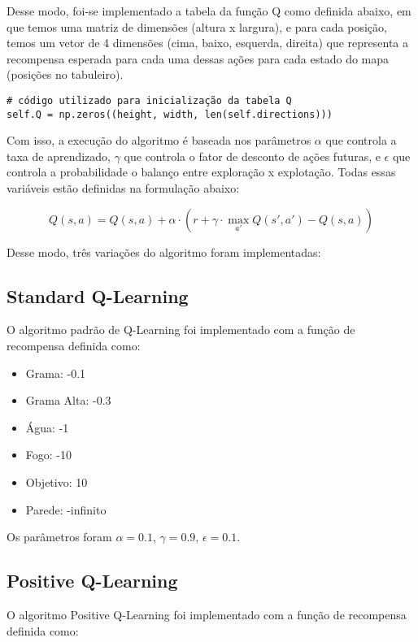 \documentclass[10pt]{extarticle} %
\begin{document}
Desse modo, foi-se implementado a tabela da função Q como definida abaixo, em que temos uma matriz de dimensões (altura x largura), e para cada posição, temos um vetor de 4 dimensões (cima, baixo, esquerda, direita) que representa a recompensa esperada para cada uma dessas ações para cada estado do mapa (posições no tabuleiro).

\begin{verbatim}
# código utilizado para inicialização da tabela Q
self.Q = np.zeros((height, width, len(self.directions)))
\end{verbatim}

Com isso, a execução do algoritmo é baseada nos parâmetros \(\alpha\) que controla a taxa de aprendizado, \(\gamma\) que controla o fator de desconto de ações futuras, e \(\epsilon\) que controla a probabilidade o balanço entre exploração x explotação. Todas essas variáveis estão definidas na formulação abaixo:

\begin{equation}
    Q(s, a) = Q(s, a) + \alpha \cdot (r + \gamma \cdot \max_{a'} Q(s', a') - Q(s, a))
\end{equation}

Desse modo, três variações do algoritmo foram implementadas:

\subsection{Standard Q-Learning}

O algoritmo padrão de Q-Learning foi implementado com a função de recompensa definida como:
\begin{itemize}
    \item Grama: -0.1
    \item Grama Alta: -0.3
    \item Água: -1
    \item Fogo: -10
    \item Objetivo: 10
    \item Parede: -infinito
\end{itemize}

Os parâmetros foram \(\alpha = 0.1\), \(\gamma = 0.9\), \(\epsilon = 0.1\).

\subsection{Positive Q-Learning }

O algoritmo Positive Q-Learning foi implementado com a função de recompensa definida como:
\end{document}

